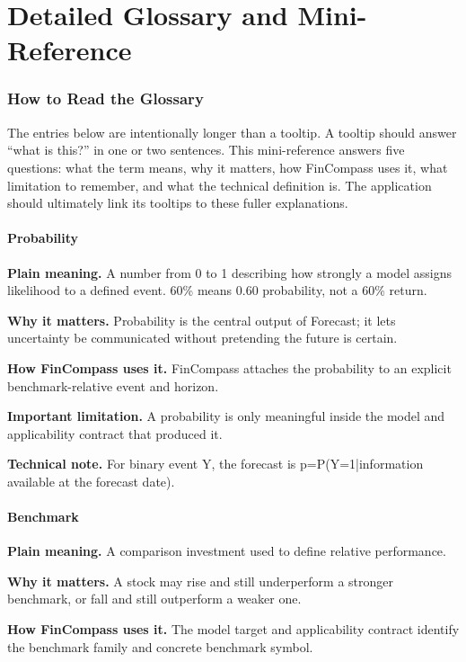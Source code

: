 \documentclass[11pt]{article}
\begin{document}
\setcounter{section}{0}
\renewcommand{\thesection}{\arabic{section}}

\clearpage
\part{Detailed Glossary and Mini-Reference}
\section{How to Read the Glossary}
The entries below are intentionally longer than a tooltip. A tooltip should answer ``what is this?'' in one or two sentences. This mini-reference answers five questions: what the term means, why it matters, how FinCompass uses it, what limitation to remember, and what the technical definition is. The application should ultimately link its tooltips to these fuller explanations.
\subsection{Probability}
\textbf{Plain meaning.} A number from 0 to 1 describing how strongly a model assigns likelihood to a defined event. 60\% means 0.60 probability, not a 60\% return.

\textbf{Why it matters.} Probability is the central output of Forecast; it lets uncertainty be communicated without pretending the future is certain.

\textbf{How FinCompass uses it.} FinCompass attaches the probability to an explicit benchmark-relative event and horizon.

\textbf{Important limitation.} A probability is only meaningful inside the model and applicability contract that produced it.

\textbf{Technical note.} For binary event Y, the forecast is p=P(Y=1|information available at the forecast date).

\subsection{Benchmark}
\textbf{Plain meaning.} A comparison investment used to define relative performance.

\textbf{Why it matters.} A stock may rise and still underperform a stronger benchmark, or fall and still outperform a weaker one.

\textbf{How FinCompass uses it.} The model target and applicability contract identify the benchmark family and concrete benchmark symbol.
\end{document}
